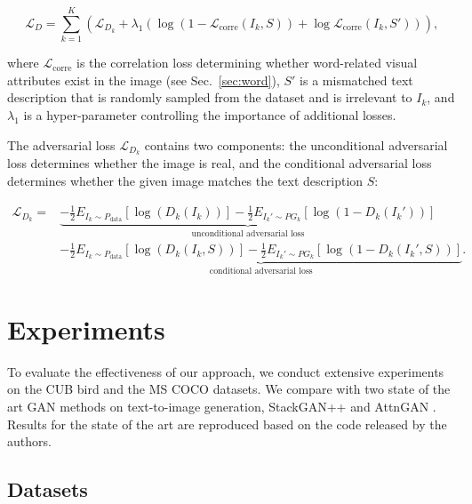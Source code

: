 \begin{equation}
\mathcal{L}_{D}=\sum _{k=1}^{K}(\mathcal{L}_{D_{k}} + \lambda_{1}(\log(1-\mathcal{L}_\text{corre}(I_{k},S))+ \log\mathcal{L}_\text{corre}(I_{k},{S}')))
\textrm{,}
\end{equation}

where $\mathcal{L}_\text{corre}$ is the correlation loss determining whether word-related visual attributes exist in the image (see Sec.~\ref{sec:word}), $S'$ is a mismatched text description that is randomly sampled from the dataset and is irrelevant to $I_{k}$, and $\lambda_{1}$ is a hyper-parameter controlling the importance of additional losses.

The adversarial loss $\mathcal{L}_{D_k}$ contains two components: the unconditional adversarial loss determines whether the image is real, and the conditional adversarial loss determines whether the given image matches the text description $S$:

\begin{equation}
\begin{split}
\mathcal{L}_{D_{k}}=&\underbrace{-\frac{1}{2}E_{I_{k}\sim P_\text{data}}\left [\log(D_{k}(I_{k})) \right ]-\frac{1}{2}E_{{I_{k}}'\sim PG_{k}}\left [ \log(1-D_{k}({I_{k}}')) \right ]}_\text{unconditional adversarial loss}\\
&\underbrace{-\frac{1}{2}E_{I_{k}\sim P_\text{data}}\left [ \log(D_{k}(I_{k},S)) \right ]-\frac{1}{2}E_{{I_{k}}'\sim PG_{k}}\left [\log(1-D_{k}({I_{k}}',S)) \right ]}_\text{conditional adversarial loss}
\textrm{.}
\end{split}
\label{eq:discriminatorlss}
\end{equation}

\section{Experiments}
\label{experiments}

To evaluate the effectiveness of our approach, we conduct extensive experiments on the CUB bird \citep{wah2011caltech} and the MS COCO \citep{lin2014microsoft} datasets. We compare with two state of the art GAN methods on text-to-image generation, StackGAN++ \cite{zhang2018stackgan++} and AttnGAN \cite{xu2018attngan}. Results for the state of the art are reproduced based on the code released by the authors.

\subsection{Datasets}

